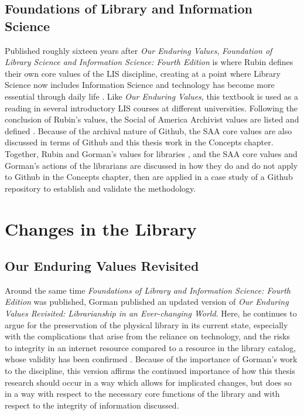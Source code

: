 \subsection{Foundations of Library and Information Science}

Published roughly sixteen years after \textit{Our Enduring Values}, \textit{Foundation of Library Science and Information Science: Fourth Edition} is where Rubin defines their own core values of the LIS discipline, creating at a point where Library Science now includes Information Science and technology has become more essential through daily life \cite{rubin2016foundationslis}. Like \textit{Our Enduring Values}, this textbook is used as a reading in several introductory LIS courses at different universities. Following the conclusion of Rubin's values, the Social of America Archivist values are listed and defined \cite{rubin2016foundationslis}. Because of the archival nature of Github, the SAA core values are also discussed in terms of Github and this thesis work in the Concepts chapter. Together, Rubin and Gorman's values for libraries , and the SAA core values and Gorman's actions of the librarians are discussed in how they do and do not apply to Github in the Concepts chapter, then are applied in a case study of a Github repository to establish and validate the methodology. 

\section{Changes in the Library}

\subsection{Our Enduring Values Revisited}

Around the same time \textit{Foundations of Library and Information Science: Fourth Edition} was published, Gorman published an updated version of \textit{Our Enduring Values Revisited: Librarianship in an Ever-changing World}. Here, he continues to argue for the preservation of the physical library in its current state, especially with the complications that arise from the reliance on technology, and the risks to integrity in an internet resource compared to a resource in the library catalog, whose validity has been confirmed \cite{gorman2000values}. Because of the importance of Gorman's work to the discipline, this version affirms the continued importance of how this thesis research should occur in a way which allows for implicated changes, but does so in a way with respect to the necessary core functions of the library and with respect to the integrity of information discussed. 

